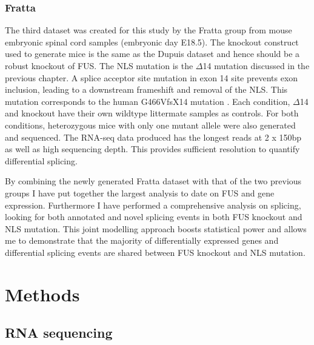 \subsubsection{Fratta}
The third dataset was created for this study by the Fratta group from mouse embryonic spinal cord samples (embryonic day E18.5).
 The knockout construct used to generate mice is the same as the Dupuis dataset and hence should be a robust knockout of FUS. 
The NLS mutation is the $\Delta$14 mutation discussed in the previous chapter. A splice acceptor site mutation in exon 14 site prevents exon inclusion, leading to a downstream frameshift and removal of the NLS. 
This mutation corresponds to the human G466VfsX14 mutation \citep{DeJesus-Hernandez2010}.
Each condition, $\Delta$14 and knockout have their own wildtype littermate samples as controls. 
For both conditions, heterozygous mice with only one mutant allele were also generated and sequenced.
The RNA-seq data produced has the longest reads at 2 x 150bp as well as high sequencing depth.
This provides sufficient resolution to quantify differential splicing.\newline

By combining the newly generated Fratta dataset with that of the two previous groups I have put together the largest analysis to date on FUS and gene expression. 
Furthermore I have performed a comprehensive analysis on splicing, looking for both annotated and novel splicing events in both FUS knockout and NLS mutation.
This joint modelling approach boosts statistical power and allows me to demonstrate that the majority of differentially expressed genes and differential splicing events are shared between FUS knockout and NLS mutation.

\clearpage






\section{Methods}

\subsection{RNA sequencing}


